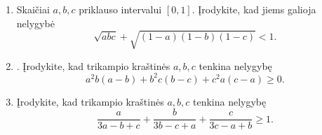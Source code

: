 \begin{enumerate}
  \item {} Skaičiai $a,b,c$ priklauso
    intervalui $[0,1]$. Įrodykite, kad jiems galioja nelygybė
    $$\sqrt{abc}+\sqrt{(1-a)(1-b)(1-c)}<1.$$
  \item \text{[IMO 1983]}. Įrodykite, kad trikampio kraštinės $a,b,c$
    tenkina nelygybę $$a^2b(a-b)+b^2c(b-c)+c^2a(c-a)\geq0.$$
  \item {} Įrodykite, kad trikampio kraštinės $a,b,c$
    tenkina nelygybę
    $$\frac{a}{3a-b+c}+\frac{b}{3b-c+a}+\frac{c}{3c-a+b}\geq1.$$

\end{enumerate}
